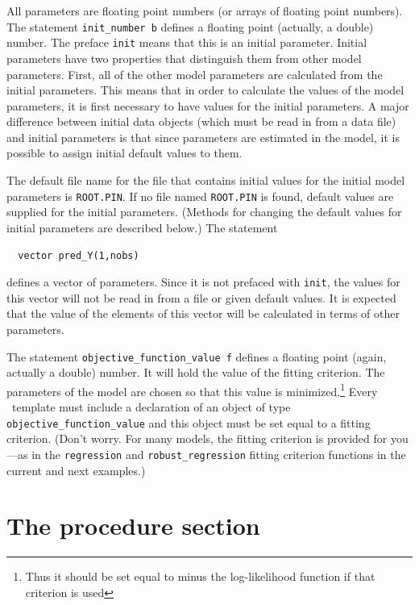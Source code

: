 \documentclass{admbmanual}
\begin{document}
All parameters are floating point numbers (or arrays of floating point numbers).
The statement \texttt{init\_number b} defines
a floating point (actually, a double) number. The preface \texttt{init}
means that this is an initial parameter. Initial parameters have
two properties that distinguish them from other model
parameters. First, all of the other model parameters are calculated from
the initial parameters. This means that in order to calculate the
values of the model parameters, it is first necessary to have 
values for the initial parameters. A major difference between
initial data objects (which must be read in from a data file) 
and initial parameters is that since parameters are estimated 
in the model, it is possible to assign initial default values to them.

The default file name for the file that contains initial
values for the initial model parameters is
\texttt{ROOT.PIN}. If no file named \texttt{ROOT.PIN} is found,
default values are supplied for the initial parameters.
(Methods for changing the default values for initial parameters
are described below.)
The statement
\begin{lstlisting}
  vector pred_Y(1,nobs)
\end{lstlisting}
defines
a vector of parameters. Since it is not prefaced with \texttt{init},
the values for this vector will not be read in from a file
or given default values. It is expected that the value of the
elements of this vector will be calculated in terms of
other parameters.

The statement  \texttt{objective\_function\_value f} defines a floating 
point 
(again, actually a double) number. It will hold the
value of the fitting criterion. The parameters of the model are
chosen so that this value is minimized.\footnote{Thus it should be set equal to
minus the log-likelihood function if that criterion is used} 
Every \ADM\ template
must include a declaration of an object of type 
\texttt{objective\_function\_value} and  this object must be
set equal to a fitting criterion. (Don't worry. For many
models, the
fitting criterion is provided for you---as in the \texttt{regression}
and \texttt{robust\_regression} fitting criterion functions 
in the current and next examples.)


\section{The procedure section}
\end{document}
